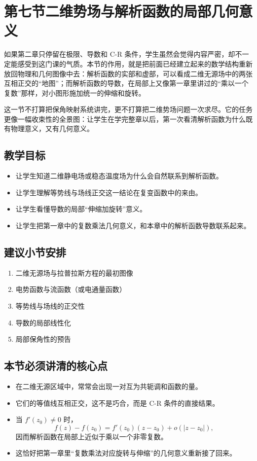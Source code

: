 \section{第七节\quad 二维势场与解析函数的局部几何意义}

\begin{wulibj}[本节要解决的问题]
如果第二章只停留在极限、导数和 C-R 条件，学生虽然会觉得内容严密，却不一定能感受到这门课的气质。本节的作用，就是把前面已经建立起来的数学结构重新放回物理和几何图像中去：解析函数的实部和虚部，可以看成二维无源场中的两张互相正交的``地图''；而解析函数的导数，在局部上又像第一章里讲过的``乘以一个复数''那样，对小图形施加统一的伸缩和旋转。

这一节不打算把保角映射系统讲完，更不打算把二维势场问题一次求尽。它的任务更像一幅收束性的全景图：让学生在学完整章以后，第一次看清解析函数为什么既有物理意义，又有几何意义。
\end{wulibj}

\subsection*{教学目标}
\begin{itemize}
    \item 让学生知道二维静电场或稳态温度场为什么会自然联系到解析函数。
    \item 让学生理解等势线与场线正交这一结论在复变函数中的来由。
    \item 让学生看懂导数的局部``伸缩加旋转''意义。
    \item 让学生把第一章中的复数乘法几何意义，和本章中的解析函数导数联系起来。
\end{itemize}

\subsection*{建议小节安排}
\begin{enumerate}
    \item 二维无源场与拉普拉斯方程的最初图像
    \item 电势函数与流函数（或电通量函数）
    \item 等势线与场线的正交性
    \item 导数的局部线性化
    \item 局部保角性的预告
\end{enumerate}

\subsection*{本节必须讲清的核心点}
\begin{itemize}
    \item 在二维无源区域中，常常会出现一对互为共轭调和函数的量。
    \item 它们的等值线互相正交，这不是巧合，而是 C-R 条件的直接结果。
    \item 当 $f'(z_0)\neq 0$ 时，
    \[
        f(z)-f(z_0)=f'(z_0)(z-z_0)+o(|z-z_0|),
    \]
    因而解析函数在局部上近似于乘以一个非零复数。
    \item 这恰好把第一章里``复数乘法对应旋转与伸缩''的几何意义重新接了回来。
\end{itemize}

